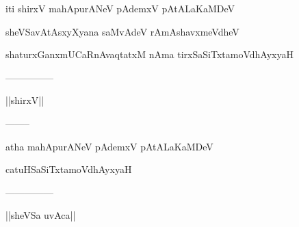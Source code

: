 \documentclass{article}
\begin{document}
\begin{center}
iti shirxV mahApurANeV pAdemxV pAtALaKaMDeV
\end{center}

\begin{center}
sheVSavAtAsxyXyana saMvAdeV rAmAshavxmeVdheV
\end{center}

\begin{center}
shaturxGanxmUCaRnAvaqtatxM nAma tirxSaSiTxtamoVdhAyxyaH
\end{center}

\begin{center}
---------------
\end{center}

\begin{center}
||shirxV||
\end{center}

\begin{center}
--------
\end{center}

\begin{center}
atha mahApurANeV pAdemxV pAtALaKaMDeV
\end{center}

\begin{center}
catuHSaSiTxtamoVdhAyxyaH
\end{center}

\begin{center}
---------------
\end{center}

\begin{center}
||sheVSa uvAca||
\end{center}
\end{document}
